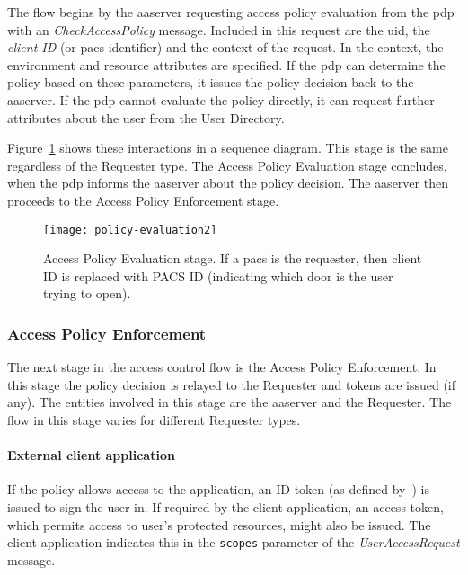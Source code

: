 The flow begins by the \acrshort{aaserver} requesting access policy evaluation from the \acrshort{pdp} with an \textit{CheckAccessPolicy} message. Included in this request are the \acrshort{uid}, the \textit{client ID} (or \acrshort{pacs} identifier) and the context of the request. In the context, the environment and resource attributes are specified. If the \acrshort{pdp} can determine the policy based on these parameters, it issues the policy decision back to the \acrshort{aaserver}. If the \acrshort{pdp} cannot evaluate the policy directly, it can request further attributes about the user from the User Directory.

Figure~\ref{fig:policy-evaluation} shows these interactions in a sequence diagram. This stage is the same regardless of the Requester type. The Access Policy Evaluation stage concludes, when the \acrshort{pdp} informs the \acrshort{aaserver} about the policy decision. The \acrshort{aaserver} then proceeds to the Access Policy Enforcement stage.

\begin{figure}[H]
    \centering
    \texttt{[image: policy-evaluation2]}
    \caption{Access Policy Evaluation stage. If a \acrshort{pacs} is the requester, then client ID is replaced with PACS ID (indicating which door is the user trying to open).}
    \label{fig:policy-evaluation}
\end{figure}

\subsubsection{Access Policy Enforcement}
The next stage in the access control flow is the Access Policy Enforcement. In this stage the policy decision is relayed to the Requester and tokens are issued (if any). The entities involved in this stage are the \acrshort{aaserver} and the Requester. The flow in this stage varies for different Requester types.

\paragraph{External client application}
If the policy allows access to the application, an ID token (as defined by~\cite{OpenID2014OpenID1}) is issued to sign the user in. If required by the client application, an access token, which permits access to user's protected resources, might also be issued. The client application indicates this in the \texttt{scopes} parameter of the \textit{UserAccessRequest} message.

